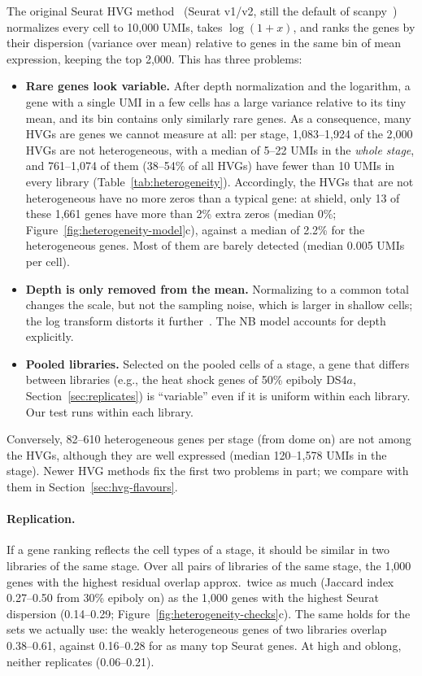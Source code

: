 \documentclass[11pt,a4paper]{article}
\begin{document}
The original Seurat HVG method~\cite{satija2015seurat} (Seurat v1/v2, still the default of scanpy~\cite{wolf2018scanpy}) normalizes every cell to 10{,}000 UMIs, takes $\log(1+x)$, and ranks the genes by their dispersion (variance over mean) relative to genes in the same bin of mean expression, keeping the top 2{,}000. This has three problems:
\begin{itemize}
	\item \textbf{Rare genes look variable.} After depth normalization and the logarithm, a gene with a single UMI in a few cells has a large variance relative to its tiny mean, and its bin contains only similarly rare genes. As a consequence, many HVGs are genes we cannot measure at all: per stage, 1{,}083--1{,}924 of the 2{,}000 HVGs are not heterogeneous, with a median of 5--22 UMIs in the \emph{whole stage}, and 761--1{,}074 of them (38--54\% of all HVGs) have fewer than 10 UMIs in every library (Table~\ref{tab:heterogeneity}). Accordingly, the HVGs that are not heterogeneous have no more zeros than a typical gene: at shield, only 13 of these 1{,}661 genes have more than 2\% extra zeros (median 0\%; Figure~\ref{fig:heterogeneity-model}c), against a median of 2.2\% for the heterogeneous genes. Most of them are barely detected (median 0.005 UMIs per cell).
	\item \textbf{Depth is only removed from the mean.} Normalizing to a common total changes the scale, but not the sampling noise, which is larger in shallow cells; the log transform distorts it further~\cite{townes2019glmpca}. The NB model accounts for depth explicitly.
	\item \textbf{Pooled libraries.} Selected on the pooled cells of a stage, a gene that differs between libraries (e.g., the heat shock genes of 50\% epiboly DS4$a$, Section~\ref{sec:replicates}) is ``variable'' even if it is uniform within each library. Our test runs within each library.
\end{itemize}
Conversely, 82--610 heterogeneous genes per stage (from dome on) are not among the HVGs, although they are well expressed (median 120--1{,}578 UMIs in the stage).
Newer HVG methods fix the first two problems in part; we compare with them in Section~\ref{sec:hvg-flavours}.

\paragraph{Replication.} If a gene ranking reflects the cell types of a stage, it should be similar in two libraries of the same stage. Over all pairs of libraries of the same stage, the 1{,}000 genes with the highest residual overlap approx.~twice as much (Jaccard index 0.27--0.50 from 30\% epiboly on) as the 1{,}000 genes with the highest Seurat dispersion (0.14--0.29; Figure~\ref{fig:heterogeneity-checks}c). The same holds for the sets we actually use: the weakly heterogeneous genes of two libraries overlap 0.38--0.61, against 0.16--0.28 for as many top Seurat genes. At high and oblong, neither replicates (0.06--0.21).
\end{document}
